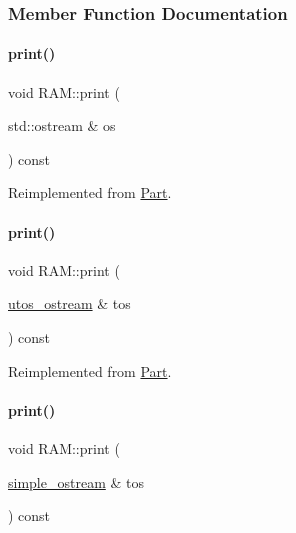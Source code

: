 \subsubsection{Member Function Documentation}
\mbox{\label{class_r_a_m_a2f226659cbc23f841d73525572ba9574}} 
\paragraph{\texorpdfstring{print()}{print()}\hspace{0.1cm}{\footnotesize\ttfamily [1/4]}}
{\footnotesize\ttfamily void R\+A\+M\+::print (\begin{DoxyParamCaption}\item[{std\+::ostream \&}]{os }\end{DoxyParamCaption}) const\hspace{0.3cm}{\ttfamily [virtual]}}



Reimplemented from \mbox{\hyperlink{class_part_a4fa402b8e8fd4236ff773a7697ab2bc3}{Part}}.

\mbox{\label{class_r_a_m_a11a874dd6cf99454efd6b7a1d20a3737}} 
\paragraph{\texorpdfstring{print()}{print()}\hspace{0.1cm}{\footnotesize\ttfamily [2/4]}}
{\footnotesize\ttfamily void R\+A\+M\+::print (\begin{DoxyParamCaption}\item[{\mbox{\hyperlink{structutos__ostream}{utos\+\_\+ostream}} \&}]{tos }\end{DoxyParamCaption}) const\hspace{0.3cm}{\ttfamily [virtual]}}



Reimplemented from \mbox{\hyperlink{class_part_a9ecabe44ba3415badf82c6a23617a41e}{Part}}.

\mbox{\label{class_r_a_m_ac2d5a8bd858289b6679e429bbe15fb20}} 
\paragraph{\texorpdfstring{print()}{print()}\hspace{0.1cm}{\footnotesize\ttfamily [3/4]}}
{\footnotesize\ttfamily void R\+A\+M\+::print (\begin{DoxyParamCaption}\item[{\mbox{\hyperlink{structsimple__ostream}{simple\+\_\+ostream}} \&}]{tos }\end{DoxyParamCaption}) const\hspace{0.3cm}{\ttfamily [virtual]}}




